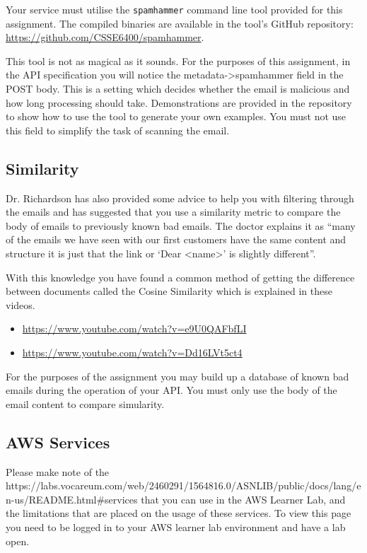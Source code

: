 \documentclass{csse4400}
\begin{document}
Your service must utilise the \texttt{spamhammer} command line tool provided for this assignment. The compiled binaries are available in the tool's GitHub repository: \url{https://github.com/CSSE6400/spamhammer}.


This tool is not as magical as it sounds. For the purposes of this assignment, in the API specification you will notice the metadata->spamhammer field in the POST body. This is a setting which decides whether the email is malicious and how long processing should take. Demonstrations are provided in the repository to show how to use the tool to generate your own examples. You must not use this field to simplify the task of scanning the email.

\subsection{Similarity}

Dr. Richardson has also provided some advice to help you with filtering through the emails and has suggested that you use a similarity metric to compare the body of emails to previously known bad emails. The doctor explains it as ``many of the emails we have seen with our first customers have the same content and structure it is just that the link or `Dear <name>' is slightly different''.

With this knowledge you have found a common method of getting the difference between documents called the Cosine Similarity which is explained in these videos.

\begin{itemize}
  \item \url{https://www.youtube.com/watch?v=e9U0QAFbfLI}
  \item \url{https://www.youtube.com/watch?v=Dd16LVt5ct4}
\end{itemize}

For the purposes of the assignment you may build up a database of known bad emails during the operation of your API. You must only use the body of the email content to compare simularity.


\subsection{AWS Services}
Please make note of the 
{https://labs.vocareum.com/web/2460291/1564816.0/ASNLIB/public/docs/lang/en-us/README.html\#services}
that you can use in the AWS Learner Lab, and the limitations that are placed on the usage of these services.
To view this page you need to be logged in to your AWS learner lab environment and have a lab open.
\end{document}
